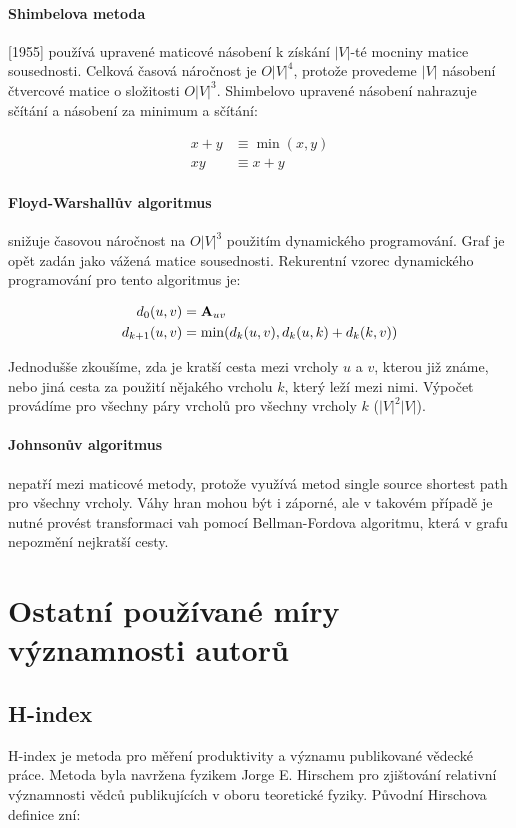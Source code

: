 \documentclass[12pt,titlepage]{report}
\begin{document}
\paragraph{Shimbelova metoda}
[1955] používá upravené maticové násobení k získání $|V|$-té mocniny matice
sousednosti. Celková časová náročnost je $O|V|^4$, protože provedeme $|V|$
násobení čtvercové matice o složitosti $O|V|^3$. Shimbelovo upravené násobení
nahrazuje sčítání a násobení za minimum a sčítání:

\begin{align*}
x + y &\equiv \min(x, y) \\
xy &\equiv x + y
\end{align*}

\paragraph{Floyd-Warshallův algoritmus} snižuje časovou náročnost na $O|V|^3$
použitím dynamického programování. Graf je opět zadán jako vážená matice
sousednosti. Rekurentní vzorec dynamického programování pro tento algoritmus je:

\begin{align*}
d_0(u, v) &= {\bf A}_{uv} \\
d_{k + 1}(u, v) &= \min(d_k(u, v), d_k(u, k) + d_k(k, v)) \\
\end{align*}

Jednodušše zkoušíme, zda je kratší cesta mezi vrcholy $u$ a $v$, kterou již
známe, nebo jiná cesta za použití nějakého vrcholu $k$, který leží mezi nimi.
Výpočet provádíme pro všechny páry vrcholů pro všechny vrcholy $k$ ($|V|^2
|V|$).

\paragraph{Johnsonův algoritmus} nepatří mezi maticové metody, protože využívá
metod single source shortest path pro všechny vrcholy. Váhy hran mohou být i
záporné, ale v takovém případě je nutné provést transformaci vah pomocí
Bellman-Fordova algoritmu, která v grafu nepozmění nejkratší cesty. 


\section{Ostatní používané míry významnosti autorů}
\subsection{H-index}
H-index je metoda pro měření produktivity a významu publikované vědecké práce.
Metoda byla navržena fyzikem Jorge E. Hirschem pro zjištování relativní
významnosti vědců publikujících v oboru teoretické fyziky. Původní Hirschova
definice zní:
\end{document}
